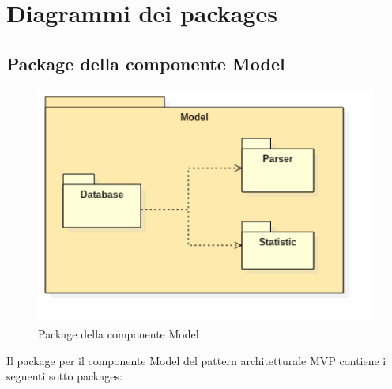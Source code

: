 \documentclass[a4paper,11pt]{article}
\begin{document}
	\section{Diagrammi dei packages}
	\subsection{Package della componente Model}
	\begin{figure}[h!]
	\begin{center}
		\includegraphics[scale=0.65]{../images/ModelPackage.png}
		\caption{Package della componente Model}
	\end{center}
	\end{figure}
	Il package per il componente Model del pattern architetturale MVP contiene i seguenti sotto packages:
\end{document}
